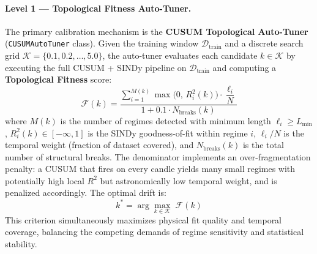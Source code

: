 \documentclass[11pt,a4paper]{article}
\begin{document}
\paragraph{Level 1 --- Topological Fitness Auto-Tuner.}
The primary calibration mechanism is the \textbf{CUSUM Topological Auto-Tuner} (\texttt{CUSUMAutoTuner} class). Given the training window $\mathcal{D}_{\text{train}}$ and a discrete search grid $\mathcal{K} = \{0.1, 0.2, \ldots, 5.0\}$, the auto-tuner evaluates each candidate $k \in \mathcal{K}$ by executing the full CUSUM + SINDy pipeline on $\mathcal{D}_{\text{train}}$ and computing a \textbf{Topological Fitness} score:
\begin{equation}
    \mathcal{F}(k) = \frac{\displaystyle\sum_{i=1}^{M(k)} \max\!\bigl(0,\, R^2_i(k)\bigr) \cdot \dfrac{\ell_i}{N}}{1 + 0.1 \cdot N_{\text{breaks}}(k)}
    \label{eq:topological_fitness}
\end{equation}
where $M(k)$ is the number of regimes detected with minimum length $\ell_i \geq L_{\min}$, $R^2_i(k) \in [-\infty, 1]$ is the SINDy goodness-of-fit within regime $i$, $\ell_i / N$ is the temporal weight (fraction of dataset covered), and $N_{\text{breaks}}(k)$ is the total number of structural breaks. The denominator implements an over-fragmentation penalty: a CUSUM that fires on every candle yields many small regimes with potentially high local $R^2$ but astronomically low temporal weight, and is penalized accordingly. The optimal drift is:
\begin{equation}
    k^* = \arg\max_{k \in \mathcal{K}}\; \mathcal{F}(k)
    \label{eq:optimal_drift}
\end{equation}
This criterion simultaneously maximizes physical fit quality and temporal coverage, balancing the competing demands of regime sensitivity and statistical stability.
\end{document}

